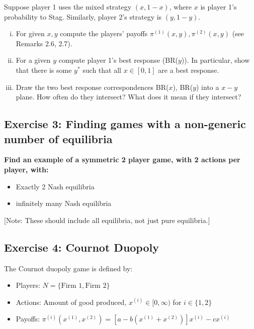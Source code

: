 \documentclass[10pt]{article}
\begin{document}
Suppose player 1 uses the mixed strategy \((x, 1- x)\), where \(x\) is player 1's
probability to Stag. Similarly, player 2's strategy is \((y, 1 - y)\).

\begin{enumerate}[(i)]
    \item For given \(x, y\) compute the players' payoffs \(\pi^{(1)}(x, y),
    \pi^{(2)}(x, y)\) (see Remarks 2.6, 2.7).
    \item For a given \(y\) compute player 1's best response (BR(\(y\))). In
    particular, show that there is some \(y^{*}\) such that all \(x \in [0,
    1]\) are a best response.
    \item Draw the two best response correspondences BR(\(x\)), BR(\(y\)) into a
    \(x-y\) plane. How often do they intersect? What does it mean if they
    intersect?
\end{enumerate}

\subsection*{Exercise 3: Finding games with a non-generic number of equilibria}

\textbf{Find an example of a symmetric 2 player game, with 2 actions per player, with:}

\begin{itemize}
    \item Exactly 2 Nash equilibria
    \item infinitely many Nash equilibria
\end{itemize}

[Note: These should include all equilibria, not just pure equilibria.]

\subsection*{Exercise 4: Cournot Duopoly}

The Cournot duopoly game is defined by:

\begin{itemize}
    \item Players: \(N = \{\text{Firm } 1, \text{Firm } 2\}\)
    \item Actions: Amount of good produced, \(x^{(i)} \in [0, \infty)\) for \(i \in \{1, 2\}\)
    \item Payoffs: \(\pi^{(i)}(x^{(1)}, x^{(2)}) = [a - b (x^{(1)} + x^{(2)})] x^{(i)} - c x^{(i)}\)
\end{itemize}
\end{document}
